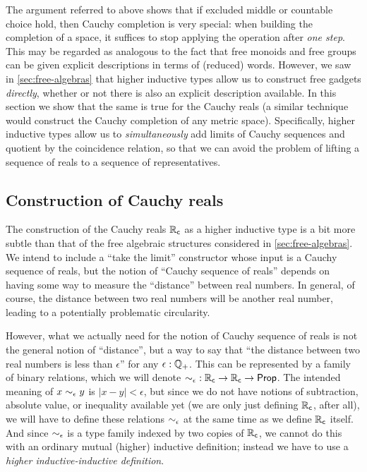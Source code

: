 The argument referred to above shows that if excluded middle or countable choice hold, then Cauchy completion is very special: when building the completion of a space, it suffices to stop applying the operation after \emph{one step}.
This may be regarded as analogous to the fact that free monoids and free groups can be given explicit descriptions in terms of (reduced) words.
However, we saw in \autoref{sec:free-algebras} that higher inductive types allow us to construct free gadgets \emph{directly}, whether or not there is also an explicit description available.
In this section we show that the same is true for the Cauchy reals (a similar technique would construct the Cauchy completion of any metric space).
Specifically, higher inductive types allow us to \emph{simultaneously} add limits of Cauchy sequences and quotient by the coincidence relation, so that we can avoid the problem of lifting a sequence of reals to a sequence of representatives.


\subsection{Construction of Cauchy reals}
\label{sec:constr-cauchy-reals}

The construction of the Cauchy reals $\mathbb{R}_\mathsf{c}$ as a higher inductive type is a bit more subtle than that of the free algebraic structures considered in \autoref{sec:free-algebras}.
We intend to include a ``take the limit'' constructor whose input is a Cauchy sequence of reals, but the notion of ``Cauchy sequence of reals'' depends on having some way to measure the ``distance'' between real numbers.
In general, of course, the distance between two real numbers will be another real number, leading to a potentially problematic circularity.

However, what we actually need for the notion of Cauchy sequence of reals is not the general notion of ``distance'', but a way to say that ``the distance between two real numbers is less than $\epsilon$'' for any $\epsilon:\mathbb{Q}_{+}$.
This can be represented by a family of binary relations, which we will denote $\mathord{\sim_{\epsilon}} : \mathbb{R}_\mathsf{c}\to\mathbb{R}_\mathsf{c}\to \mathsf{Prop}$.
The intended meaning of $x \sim_{\epsilon} y$ is $|x - y| < \epsilon$, but since we do not have notions of subtraction, absolute value, or inequality available yet (we are only just defining $\mathbb{R}_\mathsf{c}$, after all), we will have to define these relations $\sim_{\epsilon}$ at the same time as we define $\mathbb{R}_\mathsf{c}$ itself.
And since $\sim_{\epsilon}$ is a type family indexed by two copies of $\mathbb{R}_\mathsf{c}$, we cannot do this with an ordinary mutual (higher) inductive definition; instead we have to use a \emph{higher inductive-inductive definition}.

